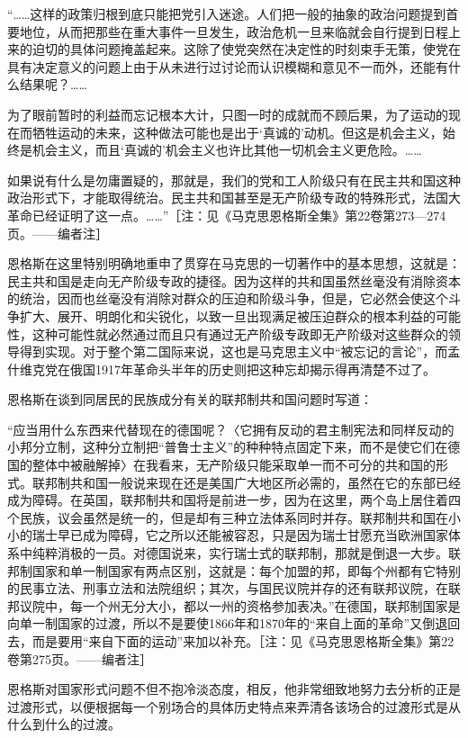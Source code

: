 \documentclass[UTF8, 12pt, a4paper]{ctexrep}
\begin{document}
“……这样的政策归根到底只能把党引入迷途。人们把一般的抽象的政治问题提到首要地位，从而把那些在重大事件一旦发生，政治危机一旦来临就会自行提到日程上来的迫切的具体问题掩盖起来。这除了使党突然在决定性的时刻束手无策，使党在具有决定意义的问题上由于从未进行过讨论而认识模糊和意见不一而外，还能有什么结果呢？……

为了眼前暂时的利益而忘记根本大计，只图一时的成就而不顾后果，为了运动的现在而牺牲运动的未来，这种做法可能也是出于‘真诚的’动机。但这是机会主义，始终是机会主义，而且‘真诚的’机会主义也许比其他一切机会主义更危险。……

如果说有什么是勿庸置疑的，那就是，我们的党和工人阶级只有在民主共和国这种政治形式下，才能取得统治。民主共和国甚至是无产阶级专政的特殊形式，法国大革命已经证明了这一点。……”［注：见《马克思恩格斯全集》第22卷第273—274页。——编者注］

恩格斯在这里特别明确地重申了贯穿在马克思的一切著作中的基本思想，这就是：民主共和国是走向无产阶级专政的捷径。因为这样的共和国虽然丝毫没有消除资本的统治，因而也丝毫没有消除对群众的压迫和阶级斗争，但是，它必然会使这个斗争扩大、展开、明朗化和尖锐化，以致一旦出现满足被压迫群众的根本利益的可能性，这种可能性就必然通过而且只有通过无产阶级专政即无产阶级对这些群众的领导得到实现。对于整个第二国际来说，这也是马克思主义中“被忘记的言论”，而孟什维克党在俄国1917年革命头半年的历史则把这种忘却揭示得再清楚不过了。

恩格斯在谈到同居民的民族成分有关的联邦制共和国问题时写道：

“应当用什么东西来代替现在的德国呢？〈它拥有反动的君主制宪法和同样反动的小邦分立制，这种分立制把“普鲁士主义”的种种特点固定下来，而不是使它们在德国的整体中被融解掉〉在我看来，无产阶级只能采取单一而不可分的共和国的形式。联邦制共和国一般说来现在还是美国广大地区所必需的，虽然在它的东部已经成为障碍。在英国，联邦制共和国将是前进一步，因为在这里，两个岛上居住着四个民族，议会虽然是统一的，但是却有三种立法体系同时并存。联邦制共和国在小小的瑞士早已成为障碍，它之所以还能被容忍，只是因为瑞士甘愿充当欧洲国家体系中纯粹消极的一员。对德国说来，实行瑞士式的联邦制，那就是倒退一大步。联邦制国家和单一制国家有两点区别，这就是：每个加盟的邦，即每个州都有它特别的民事立法、刑事立法和法院组织；其次，与国民议院并存的还有联邦议院，在联邦议院中，每一个州无分大小，都以一州的资格参加表决。”在德国，联邦制国家是向单一制国家的过渡，所以不是要使1866年和1870年的“来自上面的革命”又倒退回去，而是要用“来自下面的运动”来加以补充。［注：见《马克思恩格斯全集》第22卷第275页。——编者注］

恩格斯对国家形式问题不但不抱冷淡态度，相反，他非常细致地努力去分析的正是过渡形式，以便根据每一个别场合的具体历史特点来弄清各该场合的过渡形式是从什么到什么的过渡。
\end{document}
